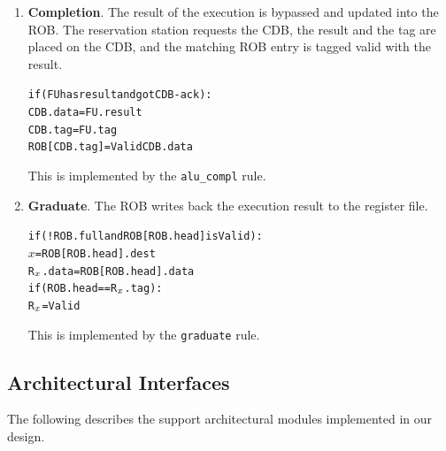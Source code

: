 \documentclass[12pt]{article}
\newcommand{\mtt}[1]{\(#1\)}
\begin{document}
\begin{enumerate}
    \item \textbf{Completion}. The result of the execution is bypassed and updated into the ROB. The reservation
    station requests the CDB, the result and the tag are placed on the CDB, and the matching ROB entry 
    is tagged valid with the result. 
        \begin{alltt}
            if (FU has result and got CDB-ack):
                CDB.data = FU.result
                CDB.tag = FU.tag
                ROB[CDB.tag] = Valid CDB.data
        \end{alltt}
        This is implemented by the \verb=alu_compl= rule.
    \item \textbf{Graduate}. The ROB writes back the execution result to the register file. 
        \begin{alltt}
            if (!ROB.full and ROB[ROB.head] is Valid):
                \mtt{x} = ROB[ROB.head].dest
                R\mtt{\sb{x}}.data = ROB[ROB.head].data
                if (ROB.head == R\mtt{\sb{x}}.tag):
                    R\mtt{\sb{x}} = Valid
            
        \end{alltt}
        This is implemented by the \verb=graduate= rule.
\end{enumerate}

\subsection{Architectural Interfaces\label{sec:modules}}

The following describes the support architectural modules implemented in our design.
\end{document}
